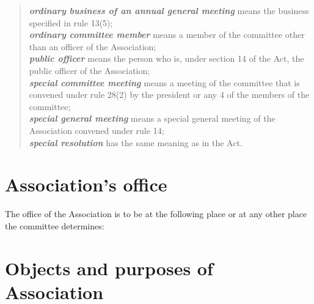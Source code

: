 \documentclass[a4paper,11pt]{article}
\begin{document}
\begin{quote}
	\textit{\textbf{ordinary business of an annual general meeting}} means the business specified in rule 13(5);\\
	\textit{\textbf{ordinary committee member}} means a member of the committee other than an officer of the Association;\\
	\textit{\textbf{public officer}} means the person who is, under section 14 of the Act, the public officer of the Association;\\
	\textit{\textbf{special committee meeting}} means a meeting of the committee that is convened under rule 28(2) by the president or any 4 of the members of the committee;\\
	\textit{\textbf{special general meeting}} means a special general meeting of the Association convened under rule 14;\\
	\textit{\textbf{special resolution}}	  has the same meaning as in the Act.
\end{quote}

\section{Association's office}

The office of the Association is to be at the following place or at any other place the committee determines:\\
\orgOffice{}

\section{Objects and purposes of Association}
\end{document}
